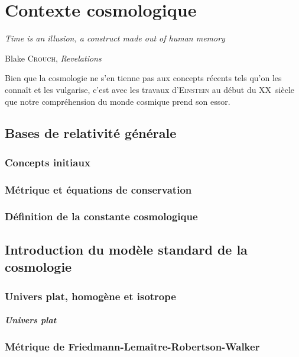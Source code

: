 \documentclass[../main/main.tex]{subfiles}
\begin{document}
\mainmatter

\chapter{Contexte cosmologique}\label{ch:cosmo}

\epigraph{\openquote\textit{Time is an illusion, a construct made out of human
memory}\closequote}{Blake \textsc{Crouch}, \textit{Revelations}}

Bien que la cosmologie ne s'en tienne pas aux concepts récents tels qu'on les
connaît et les vulgarise, c'est avec les travaux d'\textsc{Einstein} au début du
XX\ieme~siècle que notre compréhension du monde cosmique prend son essor. 

\vfill
\minitoc
\vfill

\newpage

\section{Bases de relativité générale}\label{sec:11}
\subsection{Concepts initiaux}\label{ssec:RG}
\subsection{Métrique et équations de conservation}\label{ssec:112}
\subsection{Définition de la constante cosmologique}\label{ssec:lambda}

\section{Introduction du modèle standard de la cosmologie}\label{sec:MS}
\subsection{Univers plat, homogène et isotrope}\label{ssec:plat}
\paragraph*{Univers plat}
\subsection{Métrique de Friedmann-Lemaître-Robertson-Walker}\label{ssec:FLRW}
\end{document}
